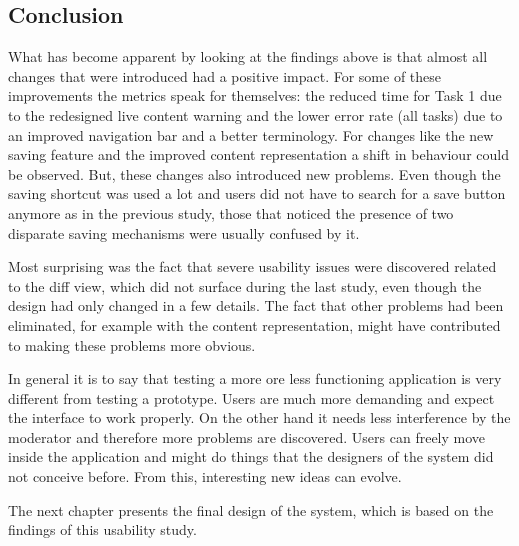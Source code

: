 \subsection{Conclusion}
What has become apparent by looking at the findings above is that almost all changes that were introduced had a positive impact. For some of these improvements the metrics speak for themselves: the reduced time for Task 1 due to the redesigned live content warning and the lower error rate (all tasks) due to an improved navigation bar and a better terminology. For changes like the new saving feature and the improved content representation a shift in behaviour could be observed. But, these changes also introduced new problems. Even though the saving shortcut was used a lot and users did not have to search for a save button anymore as in the previous study, those that noticed the presence of two disparate saving mechanisms were usually confused by it.

Most surprising was the fact that severe usability issues were discovered related to the diff view, which did not surface during the last study, even though the design had only changed in a few details. The fact that other problems had been eliminated, for example with the content representation, might have contributed to making these problems more obvious.

In general it is to say that testing a more ore less functioning application is very different from testing a prototype. Users are much more demanding and expect the interface to work properly. On the other hand it needs less interference by the moderator and therefore more problems are discovered. Users can freely move inside the application and might do things that the designers of the system did not conceive before. From this, interesting new ideas can evolve.

The next chapter presents the final design of the system, which is based on the findings of this usability study.



